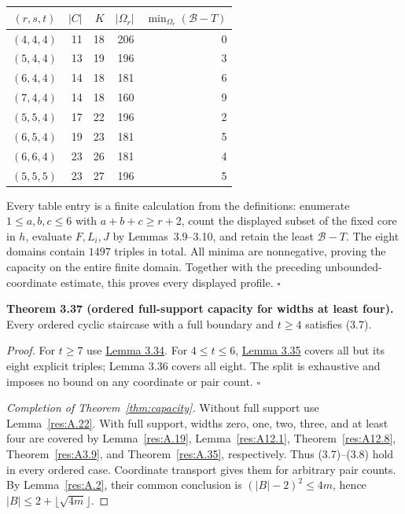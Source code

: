 \documentclass[11pt]{article}
\begin{document}
\begin{center}
\begin{tabular}{c|r|r|r|r}
 $(r,s,t)$&$|C|$&$K$&$|\Omega_r|$
    &$\min_{\Omega_r}(\mathcal B-T)$\\\hline
 $(4,4,4)$&11&18&206&0\\
 $(5,4,4)$&13&19&196&3\\
 $(6,4,4)$&14&18&181&6\\
 $(7,4,4)$&14&18&160&9\\
 $(5,5,4)$&17&22&196&2\\
 $(6,5,4)$&19&23&181&5\\
 $(6,6,4)$&23&26&181&4\\
 $(5,5,5)$&23&27&196&5
\end{tabular}
\end{center}
\hypertarget{tab:capacity-eight-profiles}{}

Every table entry is a finite calculation from the definitions:
enumerate $1\le a,b,c\le6$ with $a+b+c\ge r+2$, count the displayed
subset of the fixed core in $h$, evaluate $F,L_i,J$ by Lemmas~3.9--3.10,
and retain the least $\mathcal B-T$.
The eight domains contain $1497$ triples in total.
All minima are nonnegative, proving the capacity on the entire finite
domain.  Together with the preceding unbounded-coordinate estimate,
this proves every displayed profile. \ensuremath{\square}

\label{res:A.35}
\textbf{Theorem 3.37 (ordered full-support capacity for widths at least four).} Every ordered cyclic staircase with a full boundary and \(t\ge4\) satisfies (3.7).

\emph{Proof.} For \(t\ge7\) use \hyperref[res:A.31]{Lemma 3.34}. For \(4\le t\le6\), \hyperref[res:A.32]{Lemma 3.35} covers all but its eight explicit triples; Lemma 3.36 covers all eight. The split is exhaustive and imposes no bound on any coordinate or pair count. \ensuremath{\square}


\begin{proof}[Completion of Theorem~\ref{thm:capacity}]
Without full support use Lemma~\ref{res:A.22}. With full support,
widths zero, one, two, three, and at least four are covered by
Lemma~\ref{res:A.19}, Lemma~\ref{res:A12.1},
Theorem~\ref{res:A12.8}, Theorem~\ref{res:A3.9}, and
Theorem~\ref{res:A.35}, respectively.
Thus (3.7)--(3.8) hold in every ordered case. Coordinate transport
gives them for arbitrary pair counts. By Lemma~\ref{res:A.2}, their
common conclusion is $(|B|-2)^2\le4m$, hence
$|B|\le2+\lfloor\sqrt{4m}\rfloor$.
\end{proof}
\end{document}
